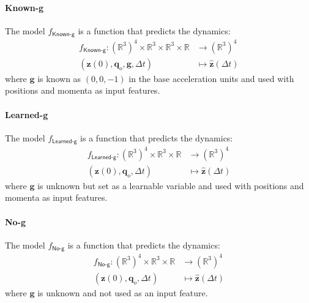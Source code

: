 \documentclass[accepted]{article}
\begin{document}
\paragraph{Known-g} The model $f_{\textsf{Known-g}}$ is a function that predicts the dynamics: 
\begin{equation}
\begin{aligned}
    f_{\textsf{Known-g}}: (\mathbb R^3)^4\times \mathbb{R}^3 \times \mathbb{R}^3 \times \mathbb R &\to (\mathbb R^{3})^4  \\
    (\mathbf{z}(0),\mathbf{q}_o,\mathbf{g},\Delta t) &\mapsto  \mathbf{\hat z}(\Delta t) 
\end{aligned}\label{eq:goal_F_know-g}
\end{equation}
where $\mathbf{g}$ is known as $(0,0,-1)$ in the base acceleration units and used with positions and momenta as input features.  

\paragraph{Learned-g} The model $f_{\textsf{Learned-g}}$ is a function that predicts the dynamics: 
\begin{equation}
\begin{aligned}
    f_{\textsf{Learned-g}}: (\mathbb R^3)^4 \times \mathbb{R}^3 \times \mathbb R &\to (\mathbb R^{3})^4  \\
    (\mathbf{z}(0),\mathbf{q}_o, \Delta t) &\mapsto  \mathbf{\hat z}(\Delta t) 
\end{aligned}\label{eq:goal_F_learn-g}
\end{equation}
where $\mathbf{g}$ is unknown but set as a learnable variable and used with positions and momenta as input features.   

\paragraph{No-g} The model $f_{\textsf{No-g}}$ is a function that predicts the dynamics: 
\begin{equation}
\begin{aligned}
    f_{\textsf{No-g}}: (\mathbb R^3)^4 \times \mathbb{R}^3 \times \mathbb R &\to (\mathbb R^{3})^4  \\
    (\mathbf{z}(0),\mathbf{q}_o, \Delta t) &\mapsto  \mathbf{\hat z}(\Delta t)
\end{aligned}\label{eq:goal_F_no-g}
\end{equation}
where $\mathbf{g}$ is unknown and not used as an input feature.
\end{document}

